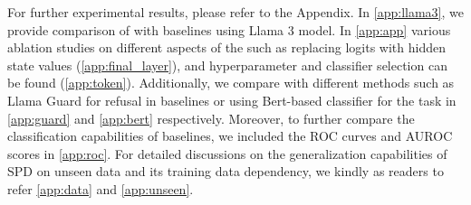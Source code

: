 For further experimental results, please refer to the Appendix. In \cref{app:llama3}, we provide comparison of \methodname{} with baselines using Llama 3 model. In \cref{app:app} various ablation studies on different aspects of the \methodname{} such as replacing logits with hidden state values (\cref{app:final_layer}), and hyperparameter and classifier selection can be found (\cref{app:token}). Additionally, we compare \methodname{} with different methods such as Llama Guard for refusal in baselines or using Bert-based classifier for the task in \cref{app:guard} and \cref{app:bert} respectively. Moreover, to further compare the classification capabilities of baselines, we included the ROC curves and AUROC scores in \cref{app:roc}. For detailed discussions on the generalization capabilities of SPD on unseen data and its training data dependency, we kindly as readers to refer \cref{app:data} and \cref{app:unseen}.
